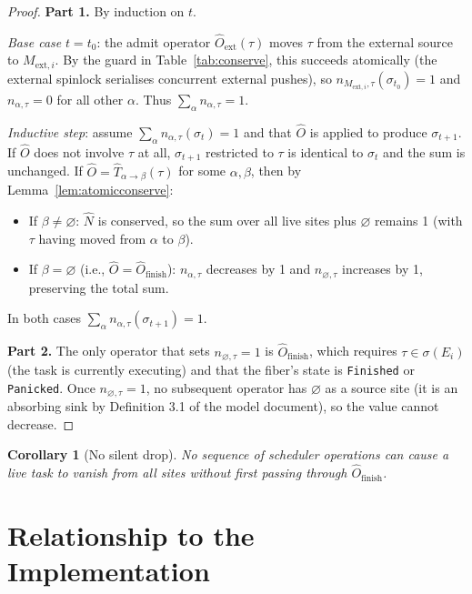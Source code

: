 \documentclass[11pt,a4paper]{article}
\newtheorem{corollary}[theorem]{Corollary}
\newcommand{\Num}{\hat{N}}
\newcommand{\Trf}[2]{\hat{T}_{#1 \to #2}}
\newcommand{\code}[1]{\texttt{#1}}
\begin{document}
\begin{proof}
\textbf{Part 1.}  By induction on $t$.

\emph{Base case} $t = t_0$: the admit operator
$\hat{O}_{\text{ext}}(\tau)$ moves $\tau$ from the external source to
$M_{\text{ext},i}$.  By the guard in Table~\ref{tab:conserve}, this
succeeds atomically (the external spinlock serialises concurrent
external pushes), so $n_{M_{\text{ext},i},\tau}(\sigma_{t_0}) = 1$
and $n_{\alpha,\tau} = 0$ for all other $\alpha$.  Thus
$\sum_\alpha n_{\alpha,\tau} = 1$.

\emph{Inductive step}: assume $\sum_\alpha n_{\alpha,\tau}(\sigma_t)
= 1$ and that $\hat{O}$ is applied to produce $\sigma_{t+1}$.  If
$\hat{O}$ does not involve $\tau$ at all, $\sigma_{t+1}$ restricted to
$\tau$ is identical to $\sigma_t$ and the sum is unchanged.  If
$\hat{O} = \Trf{\alpha}{\beta}(\tau)$ for some $\alpha, \beta$, then
by Lemma~\ref{lem:atomicconserve}:
\begin{itemize}
  \item If $\beta \neq \varnothing$: $\Num$ is conserved, so the sum
        over all live sites plus $\varnothing$ remains 1 (with $\tau$
        having moved from $\alpha$ to $\beta$).
  \item If $\beta = \varnothing$ (i.e., $\hat{O} =
        \hat{O}_{\text{finish}}$): $n_{\alpha,\tau}$ decreases by 1
        and $n_{\varnothing,\tau}$ increases by 1, preserving the
        total sum.
\end{itemize}
In both cases $\sum_\alpha n_{\alpha,\tau}(\sigma_{t+1}) = 1$.

\textbf{Part 2.}  The only operator that sets
$n_{\varnothing,\tau} = 1$ is $\hat{O}_{\text{finish}}$, which
requires $\tau \in \sigma(E_i)$ (the task is currently executing) and
that the fiber's state is \code{Finished} or \code{Panicked}.  Once
$n_{\varnothing,\tau} = 1$, no subsequent operator has $\varnothing$
as a source site (it is an absorbing sink by Definition 3.1 of the
model document), so the value cannot decrease.
\end{proof}

\begin{corollary}[No silent drop]
No sequence of scheduler operations can cause a live task to vanish
from all sites without first passing through $\hat{O}_{\text{finish}}$.
\end{corollary}

\section{Relationship to the Implementation}
\end{document}
